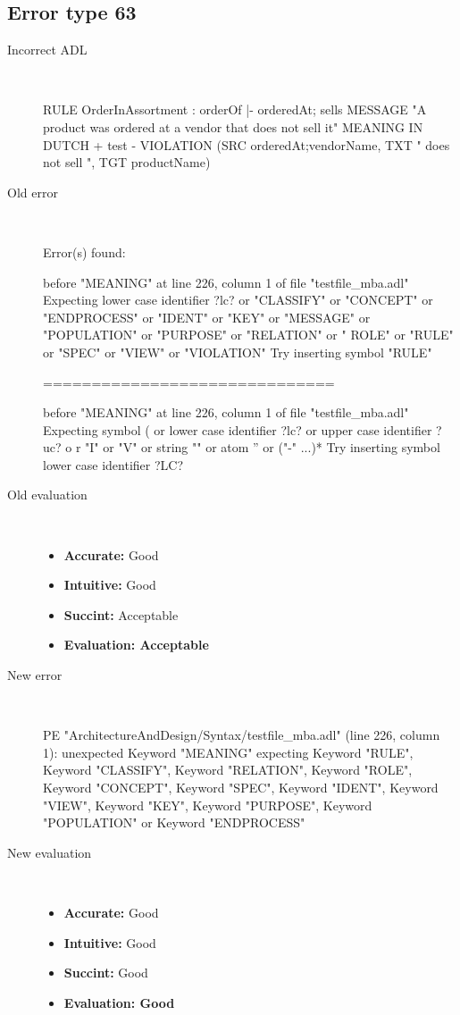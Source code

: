\hrulefill

\subsection{Error type 63}
  \begin{description}
  \item[Incorrect ADL]~\\
\begin{adl}
RULE OrderInAssortment : orderOf |- orderedAt; sells 
MESSAGE "A product was ordered at a vendor that does not sell it"
MEANING IN DUTCH  {+ test -}
VIOLATION (SRC orderedAt;vendorName, TXT " does not sell ", TGT productName)
\end{adl}
  \item[Old error]~\\
\begin{haskell}
Error(s) found:

before "MEANING" at line 226, column 1 of file "testfile_mba.adl"
Expecting lower case identifier ?lc? or "CLASSIFY" or "CONCEPT" or "ENDPROCESS"
or "IDENT" or "KEY" or "MESSAGE" or "POPULATION" or "PURPOSE" or "RELATION" or "
ROLE" or "RULE" or "SPEC" or "VIEW" or "VIOLATION"
Try inserting symbol "RULE"

==============================

before "MEANING" at line 226, column 1 of file "testfile_mba.adl"
Expecting symbol ( or lower case identifier ?lc? or upper case identifier ?uc? o
r "I" or "V" or string "" or atom '' or ("-" ...)*
Try inserting symbol lower case identifier ?LC?
\end{haskell}
  \item[Old evaluation]~\\
    \begin{itemize}
    \item \textbf{Accurate:} Good
    \item \textbf{Intuitive:} Good
    \item \textbf{Succint:} Acceptable
    \item \textbf{Evaluation: Acceptable}
    \end{itemize}
  \item[New error]~\\
\begin{haskell}
PE "ArchitectureAndDesign/Syntax/testfile_mba.adl" (line 226, column 1):
unexpected Keyword "MEANING"
expecting Keyword "RULE", Keyword "CLASSIFY", Keyword "RELATION", Keyword "ROLE", Keyword "CONCEPT", Keyword "SPEC", Keyword "IDENT", Keyword "VIEW", Keyword "KEY", Keyword "PURPOSE", Keyword "POPULATION" or Keyword "ENDPROCESS"
\end{haskell}
  \item[New evaluation]~\\
    \begin{itemize}
    \item \textbf{Accurate:} Good
    \item \textbf{Intuitive:} Good
    \item \textbf{Succint:} Good
    \item \textbf{Evaluation: Good
}
    \end{itemize}
  \end{description}

